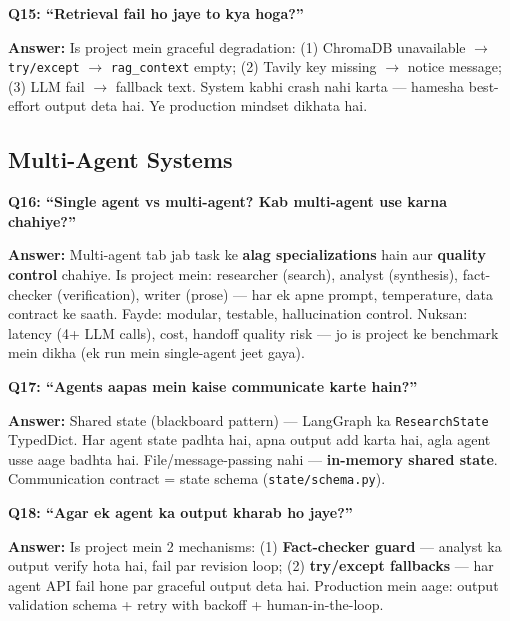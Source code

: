 \begin{interviewbox}
\textbf{Q15: ``Retrieval fail ho jaye to kya hoga?''}

\textbf{Answer:} Is project mein graceful degradation: (1) ChromaDB unavailable $\rightarrow$ \texttt{try/except} $\rightarrow$ \texttt{rag\_context} empty; (2) Tavily key missing $\rightarrow$ notice message; (3) LLM fail $\rightarrow$ fallback text. System kabhi crash nahi karta --- hamesha best-effort output deta hai. Ye production mindset dikhata hai.
\end{interviewbox}

\subsection{Multi-Agent Systems}

\begin{interviewbox}
\textbf{Q16: ``Single agent vs multi-agent? Kab multi-agent use karna chahiye?''}

\textbf{Answer:} Multi-agent tab jab task ke \textbf{alag specializations} hain aur \textbf{quality control} chahiye. Is project mein: researcher (search), analyst (synthesis), fact-checker (verification), writer (prose) --- har ek apne prompt, temperature, data contract ke saath. Fayde: modular, testable, hallucination control. Nuksan: latency (4+ LLM calls), cost, handoff quality risk --- jo is project ke benchmark mein dikha (ek run mein single-agent jeet gaya).
\end{interviewbox}

\begin{interviewbox}
\textbf{Q17: ``Agents aapas mein kaise communicate karte hain?''}

\textbf{Answer:} Shared state (blackboard pattern) --- LangGraph ka \texttt{ResearchState} TypedDict. Har agent state padhta hai, apna output add karta hai, agla agent usse aage badhta hai. File/message-passing nahi --- \textbf{in-memory shared state}. Communication contract = state schema (\texttt{state/schema.py}).
\end{interviewbox}

\begin{interviewbox}
\textbf{Q18: ``Agar ek agent ka output kharab ho jaye?''}

\textbf{Answer:} Is project mein 2 mechanisms: (1) \textbf{Fact-checker guard} --- analyst ka output verify hota hai, fail par revision loop; (2) \textbf{try/except fallbacks} --- har agent API fail hone par graceful output deta hai. Production mein aage: output validation schema + retry with backoff + human-in-the-loop.
\end{interviewbox}

